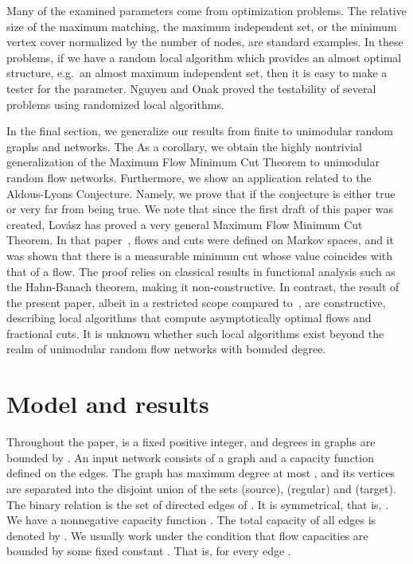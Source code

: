 \documentclass[12pt,a4paper]{article}
\renewcommand{\:}{\colon}
\begin{document}
Many of the examined parameters come from optimization problems. 
The relative size of the maximum matching, the maximum independent set, or the minimum vertex cover normalized by the number of nodes, are standard examples. 
In these problems, if we have a random local algorithm which provides an almost optimal structure, e.g.\ an almost maximum independent set, then it is easy to make a tester for the parameter. 
Nguyen and Onak \cite{NgOn} proved the testability of several problems using randomized local algorithms.



In the final section, we generalize our results from finite to unimodular random graphs and networks. 
The 
As a corollary, we obtain the highly nontrivial generalization of the Maximum Flow Minimum Cut Theorem to unimodular random flow networks. 
Furthermore, we show an application related to the Aldous-Lyons Conjecture. 
Namely, we prove that if the conjecture is either true or very far from being true. 
We note that since the first draft of this paper was created, Lovász has proved a very general Maximum Flow Minimum Cut Theorem. 
In that paper~\cite{Lovaszmeasure}, flows and cuts were defined on Markov spaces, and it was shown that there is a measurable minimum cut whose value coincides with that of a flow. 
The proof relies on classical results in functional analysis such as the Hahn-Banach theorem, making it non-constructive. 
In contrast, the result of the present paper, albeit in a restricted scope compared to~\cite{Lovaszmeasure}, are constructive, describing local algorithms that compute asymptotically optimal flows and fractional cuts. 
It is unknown whether such local algorithms exist beyond the realm of unimodular random flow networks with bounded degree. 


\section{Model and results}

Throughout the paper,  is a fixed positive integer, and degrees in graphs are bounded by . 
An input network  consists of a graph  and a capacity function  defined on the edges. 
The graph  has maximum degree at most , and its vertices are separated into the disjoint union of the sets  (source),  (regular) and  (target). The binary relation  is the set of directed edges of . 
It is symmetrical, that is, . 
We have a nonnegative capacity function . 
The total capacity of all edges is denoted by . 
We usually work under the condition that flow capacities are bounded by some fixed constant . 
That is,  for every edge . 
\end{document}
